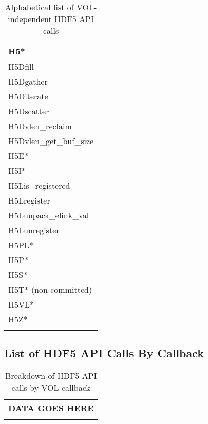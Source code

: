 \begin{longtable}{ |>{\raggedright\arraybackslash}p{\linewidth}| }
    \hline
    H5* \\
    \hline
    H5Dfill \\
    H5Dgather \\
    H5Diterate \\
    H5Dscatter \\
    H5Dvlen\_reclaim \\
    H5Dvlen\_get\_buf\_size \\
    \hline
    H5E* \\
    H5I* \\
    \hline
    H5Lis\_registered \\
    H5Lregister \\
    H5Lunpack\_elink\_val \\
    H5Lunregister \\
    \hline
    H5PL* \\
    H5P* \\
    H5S* \\
    H5T* (non-committed) \\
    H5VL* \\
    H5Z* \\
    \hline
\caption{Alphabetical list of VOL-independent HDF5 API calls}
\end{longtable}

\subsection{List of HDF5 API Calls By Callback}

\begin{longtable}{ |>{\raggedright\arraybackslash}p{\linewidth}| }
    \hline
    DATA GOES HERE \\
    \hline
\caption{Breakdown of HDF5 API calls by VOL callback}
\end{longtable}


